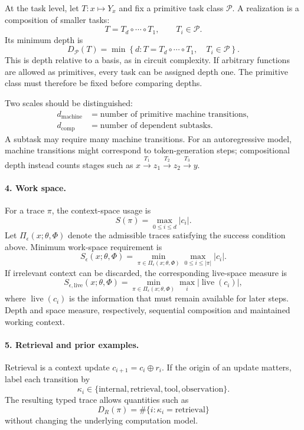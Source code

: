 \documentclass[11pt]{article}
\begin{document}
At the task level, let $T:x\mapsto Y_x$ and fix a primitive task class
$\mathcal P$. A realization is a composition of smaller tasks:
\[
T=T_d\circ\cdots\circ T_1,\qquad T_i\in\mathcal P.
\]
Its minimum depth is
\[
D_{\mathcal P}(T)
=
\min\left\{
d:T=T_d\circ\cdots\circ T_1,\quad T_i\in\mathcal P
\right\}.
\]
This is depth relative to a basis, as in circuit complexity. If arbitrary
functions are allowed as primitives, every task can be assigned depth one.
The primitive class must therefore be fixed before comparing depths.

Two scales should be distinguished:
\[
\begin{aligned}
d_{\mathrm{machine}}
&=\text{number of primitive machine transitions},\\
d_{\mathrm{comp}}
&=\text{number of dependent subtasks}.
\end{aligned}
\]
A subtask may require many machine transitions. For an autoregressive
model, machine transitions might correspond to token-generation steps;
compositional depth instead counts stages such as
$x\xrightarrow{T_1}z_1\xrightarrow{T_2}z_2\xrightarrow{T_3}y$.

\paragraph{4. Work space.}
For a trace $\pi$, the context-space usage is
\[
S(\pi)=\max_{0\leq i\leq d}|c_i|.
\]
Let $\Pi_\epsilon(x;\theta,\Phi)$ denote the admissible traces satisfying
the success condition above. Minimum work-space requirement is
\[
S_\epsilon(x;\theta,\Phi)
=
\min_{\pi\in\Pi_\epsilon(x;\theta,\Phi)}
\max_{0\leq i\leq|\pi|}|c_i|.
\]
If irrelevant context can be discarded, the corresponding live-space
measure is
\[
S_{\epsilon,\mathrm{live}}(x;\theta,\Phi)
=
\min_{\pi\in\Pi_\epsilon(x;\theta,\Phi)}
\max_i|\operatorname{live}(c_i)|,
\]
where $\operatorname{live}(c_i)$ is the information that must remain
available for later steps. Depth and space measure, respectively,
sequential composition and maintained working context.

\paragraph{5. Retrieval and prior examples.}
Retrieval is a context update $c_{i+1}=c_i\oplus r_i$.
If the origin of an update matters, label each transition by
\[
\kappa_i\in
\{\text{internal},\text{retrieval},\text{tool},\text{observation}\}.
\]
The resulting typed trace allows quantities such as
\[
D_R(\pi)=\#\{i:\kappa_i=\text{retrieval}\}
\]
without changing the underlying computation model.
\end{document}

